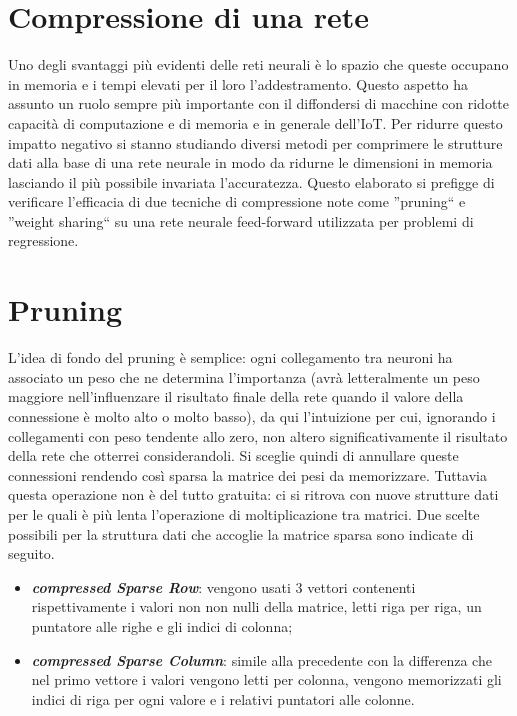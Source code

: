 \documentclass[12pt]{report}
\begin{document}
\section{Compressione di una rete}

Uno degli svantaggi più evidenti delle reti neurali è lo spazio che queste occupano in memoria e i tempi elevati per il loro l’addestramento. Questo aspetto ha assunto un ruolo sempre più importante con il diffondersi di macchine con ridotte capacità di computazione e di memoria e in generale dell’IoT. 
Per ridurre questo impatto negativo si stanno studiando diversi metodi per comprimere le strutture dati alla base di una rete neurale in modo da ridurne le dimensioni in memoria lasciando il più possibile invariata l’accuratezza. Questo elaborato si prefigge di verificare l'efficacia di due tecniche di compressione note come ''pruning`` e ''weight sharing`` su una rete neurale feed-forward utilizzata per problemi di regressione.

\section{Pruning}

L’idea di fondo del pruning è semplice: ogni collegamento tra neuroni ha associato un peso che ne determina l’importanza (avrà letteralmente un peso maggiore nell’influenzare il risultato finale della rete quando il valore della connessione è molto alto o molto basso), da qui l’intuizione per cui, ignorando i collegamenti con peso tendente allo zero, non altero significativamente il risultato della rete che otterrei considerandoli. 
Si sceglie quindi di annullare queste connessioni rendendo così sparsa la matrice dei pesi da memorizzare. Tuttavia questa operazione non è del tutto gratuita: ci si ritrova con nuove strutture dati per le quali è più lenta l'operazione di moltiplicazione tra matrici. Due scelte possibili per la struttura dati che accoglie la matrice sparsa sono indicate di seguito.
\begin{itemize}
\item{\textbf{\textit{compressed Sparse Row}}}: vengono usati 3 vettori contenenti rispettivamente i valori non non nulli della matrice, letti riga per riga, un puntatore alle righe e gli indici di colonna;
\item{\textbf{\textit{compressed Sparse Column}}}: simile alla precedente con la differenza che nel primo vettore i valori vengono letti per colonna, vengono memorizzati gli indici di riga per ogni valore e i relativi puntatori alle colonne.
\end{itemize}
\end{document}
